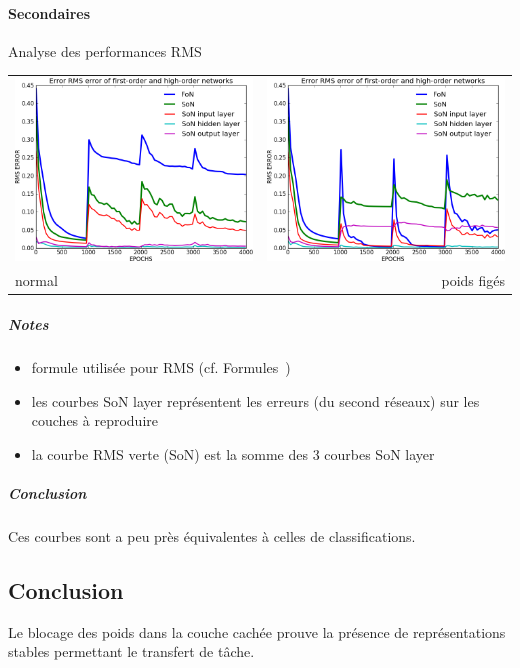     \paragraph{Secondaires}
      Analyse des performances RMS
      \begin{center}
	\begin{tabular}{lr}
	  \hspace*{-1cm}
	  \includegraphics[width=250px]{data/expB1/rms.png}
	  &
	  \includegraphics[width=250px]{data/expB1/rms_block.png} \\
	  normal 
	  &
	  poids figés
	\end{tabular}
      \end{center} 
      \subparagraph{Notes}
	\begin{itemize}
	  \item formule utilisée pour RMS (cf. Formules~)
	  \item les courbes SoN layer représentent les erreurs (du second réseaux) sur les couches à reproduire 
	  \item la courbe RMS verte (SoN) est la somme des 3 courbes SoN layer
	\end{itemize}
      \subparagraph{Conclusion}
	Ces courbes sont a peu près équivalentes à celles de classifications.

  \subsection{Conclusion}
  Le blocage des poids dans la couche cachée prouve la présence de représentations stables permettant le 
  transfert de tâche.
  
